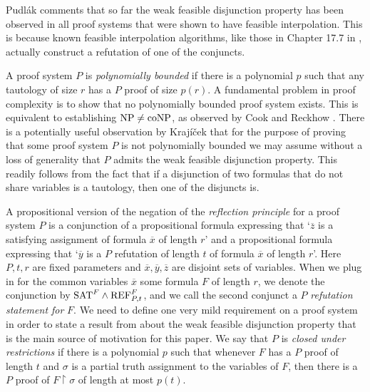 \documentclass[10pt,a4paper]{article}
\theoremstyle{remark}
\newtheorem*{switching lemma}{Switching Lemma}
\newtheorem*{open problem}{Open Problem}
\theoremstyle{definition}
\begin{document}
Pudl\'ak \cite{Pudlak2003} comments that so far the weak feasible disjunction property has been observed in all proof systems that were shown to have feasible interpolation. This is because known feasible interpolation algorithms, like those in Chapter 17.7 in \cite{Krajicek2019-book}, actually construct a refutation of one of the conjuncts.

A proof system $P$ is \emph{polynomially bounded} if there is a polynomial $p$ such that any tautology of size $r$ has a $P$ proof of size $p(r)$. A fundamental problem in proof complexity is to show that no polynomially bounded proof system exists. This is equivalent to establishing $\textnormal{NP} \neq \textnormal{coNP}$, as observed by Cook and Reckhow \cite{cook-reckhow1979}. There is a potentially useful observation by Kraj\'{i}\v{c}ek \cite{Krajicek2011} that for the purpose of proving that some proof system $P$ is not polynomially bounded we may assume without a loss of generality that $P$ admits the weak feasible disjunction property. This readily follows from the fact that if a disjunction of two formulas that do not share variables is a tautology, then one of the disjuncts is. 

A propositional version of the negation of the \emph{reflection principle} for a proof system $P$ is a conjunction of a propositional formula expressing that `$\overline{z}$ is a satisfying assignment of formula $\overline{x}$ of length $r$' and a propositional formula expressing that `$\overline{y}$ is a $P$ refutation of length $t$ of formula $\overline{x}$ of length $r$'. Here $P, t, r$ are fixed parameters and $\overline{x},\overline{y},\overline{z}$ are disjoint sets of variables. When we plug in for the common variables  $\overline{x}$ some formula $F$ of length $r$, we denote the conjunction by $\textnormal{SAT}^F \land \textnormal{REF}^F_{P,t}$, and we call the second conjunct a $P$ \emph{refutation statement for} $F$. We need to define one very mild requirement on a proof system in order to state a result from \cite{Pudlak2003} about the weak feasible disjunction property that is the main source of motivation for this paper. 
We say that $P$ is \emph{closed under restrictions} if there is a polynomial $p$ such that whenever $F$ has a $P$ proof of length $t$ and $\sigma$ is a partial truth assignment to the variables of $F$, then there is a $P$ proof of $F \! \restriction \! \sigma$ of length at most $p(t)$.
\end{document}
